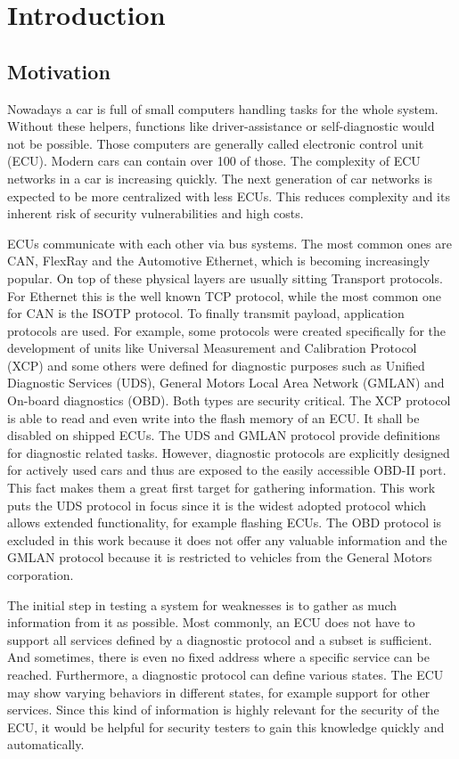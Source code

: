 \section{Introduction}

\subsection{Motivation}
Nowadays a car is full of small computers handling tasks for the whole system. Without these helpers, functions like driver-assistance or self-diagnostic would not be possible. Those computers are generally called electronic control unit (ECU). Modern cars can contain over 100 of those. The complexity of ECU networks in a car is increasing quickly. The next generation of car networks is expected to be more centralized with less ECUs. This reduces complexity and its inherent risk of security vulnerabilities and high costs.

ECUs communicate with each other via bus systems. The most common ones are CAN, FlexRay and the Automotive Ethernet, which is becoming increasingly popular. On top of these physical layers are usually sitting Transport protocols. For Ethernet this is the well known TCP protocol, while the most common one for CAN is the ISOTP protocol. To finally transmit payload, application protocols are used. For example, some protocols were created specifically for the development of units like Universal Measurement and Calibration Protocol (XCP) and some others were defined for diagnostic purposes such as Unified Diagnostic Services (UDS), General Motors Local Area Network (GMLAN) and On-board diagnostics (OBD). Both types are security critical. The XCP protocol is able to read and even write into the flash memory of an ECU. It shall be disabled on shipped ECUs. The UDS and GMLAN protocol provide definitions for diagnostic related tasks. However, diagnostic protocols are explicitly designed for actively used cars and thus are exposed to the easily accessible OBD-II port. This fact makes them a great first target for gathering information. This work puts the UDS protocol in focus since it is the widest adopted protocol which allows extended functionality, for example flashing ECUs. The OBD protocol is excluded in this work because it does not offer any valuable information and the GMLAN protocol because it is restricted to vehicles from the General Motors corporation.

The initial step in testing a system for weaknesses is to gather as much information from it as possible. Most commonly, an ECU does not have to support all services defined by a diagnostic protocol and a subset is sufficient. And sometimes, there is even no fixed address where a specific service can be reached.
Furthermore, a diagnostic protocol can define various states. The ECU may show varying behaviors in different states, for example support for other services. Since this kind of information is highly relevant for the security of the ECU, it would be helpful for security testers to gain this knowledge quickly and automatically.

